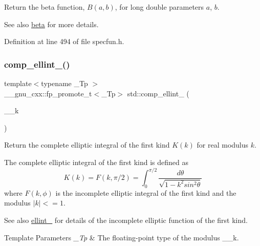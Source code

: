 Return the beta function, $B(a,b)$, for long double parameters $ a $, $ b $.

\begin{DoxySeeAlso}{See also}
\hyperlink{group__tr29124__math__spec__func_gacd36403ae64b89840b1504f97024dcee}{beta} for more details. 
\end{DoxySeeAlso}


Definition at line 494 of file specfun.\+h.

\mbox{\label{group__tr29124__math__spec__func_gad559217fb01e7a8b7a6e23eeedda64be}} 
\subsubsection{\texorpdfstring{comp\+\_\+ellint\+\_()}{comp\_ellint\_1()}}
{\footnotesize\ttfamily template$<$typename \+\_\+\+Tp $>$ \\
\+\_\+\+\_\+gnu\+\_\+cxx\+::fp\+\_\+promote\+\_\+t$<$\+\_\+\+Tp$>$ std\+::comp\+\_\+ellint\+\_ (\begin{DoxyParamCaption}\item[{\+\_\+\+Tp}]{\+\_\+\+\_\+k }\end{DoxyParamCaption})\hspace{0.3cm}{\ttfamily [inline]}}

Return the complete elliptic integral of the first kind $ K(k) $ for real modulus $ k $.

The complete elliptic integral of the first kind is defined as \[ K(k) = F(k,\pi/2) = \int_0^{\pi/2}\frac{d\theta} {\sqrt{1 - k^2 sin^2\theta}} \] where $ F(k,\phi) $ is the incomplete elliptic integral of the first kind and the modulus $ |k| <= 1 $. \begin{DoxySeeAlso}{See also}
\hyperlink{group__tr29124__math__spec__func_ga1550d6947bbbeee9865aabd398102a36}{ellint\+\_} for details of the incomplete elliptic function of the first kind.
\end{DoxySeeAlso}

\begin{DoxyTemplParams}{Template Parameters}
{\em \+\_\+\+Tp} & The floating-\/point type of the modulus {\ttfamily \+\_\+\+\_\+k}. \\
\hline
\end{DoxyTemplParams}


